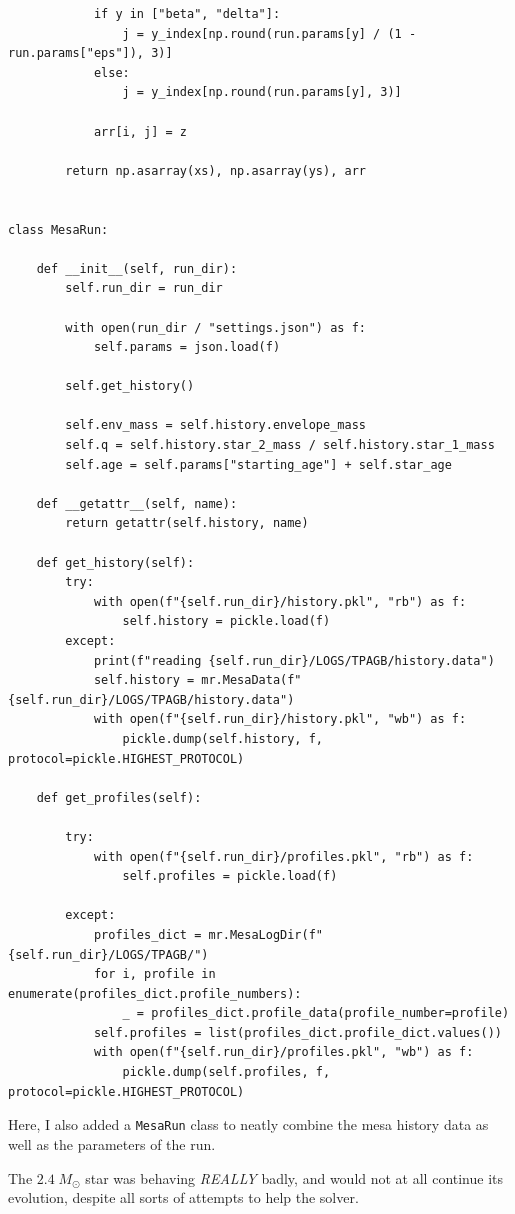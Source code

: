 \documentclass[a4paper,10pt]{article}
\begin{document}
\begin{verbatim}
            if y in ["beta", "delta"]:
                j = y_index[np.round(run.params[y] / (1 - run.params["eps"]), 3)]
            else:
                j = y_index[np.round(run.params[y], 3)]

            arr[i, j] = z

        return np.asarray(xs), np.asarray(ys), arr


class MesaRun:

    def __init__(self, run_dir):
        self.run_dir = run_dir

        with open(run_dir / "settings.json") as f:
            self.params = json.load(f)

        self.get_history()

        self.env_mass = self.history.envelope_mass
        self.q = self.history.star_2_mass / self.history.star_1_mass
        self.age = self.params["starting_age"] + self.star_age

    def __getattr__(self, name):
        return getattr(self.history, name)

    def get_history(self):
        try:
            with open(f"{self.run_dir}/history.pkl", "rb") as f:
                self.history = pickle.load(f)
        except:
            print(f"reading {self.run_dir}/LOGS/TPAGB/history.data")
            self.history = mr.MesaData(f"{self.run_dir}/LOGS/TPAGB/history.data")
            with open(f"{self.run_dir}/history.pkl", "wb") as f:
                pickle.dump(self.history, f, protocol=pickle.HIGHEST_PROTOCOL)

    def get_profiles(self):

        try:
            with open(f"{self.run_dir}/profiles.pkl", "rb") as f:
                self.profiles = pickle.load(f)

        except:
            profiles_dict = mr.MesaLogDir(f"{self.run_dir}/LOGS/TPAGB/")
            for i, profile in enumerate(profiles_dict.profile_numbers):
                _ = profiles_dict.profile_data(profile_number=profile)
            self.profiles = list(profiles_dict.profile_dict.values())
            with open(f"{self.run_dir}/profiles.pkl", "wb") as f:
                pickle.dump(self.profiles, f, protocol=pickle.HIGHEST_PROTOCOL)
\end{verbatim}

Here, I also added a \lstinline[style=output, breaklines=true]|MesaRun| class to neatly combine the mesa history data as well as the parameters of the run.


The \(2.4\;M_\odot \) star was behaving \emph{REALLY} badly, and would not at all continue its evolution, despite all sorts of attempts to help the solver.
\end{document}
